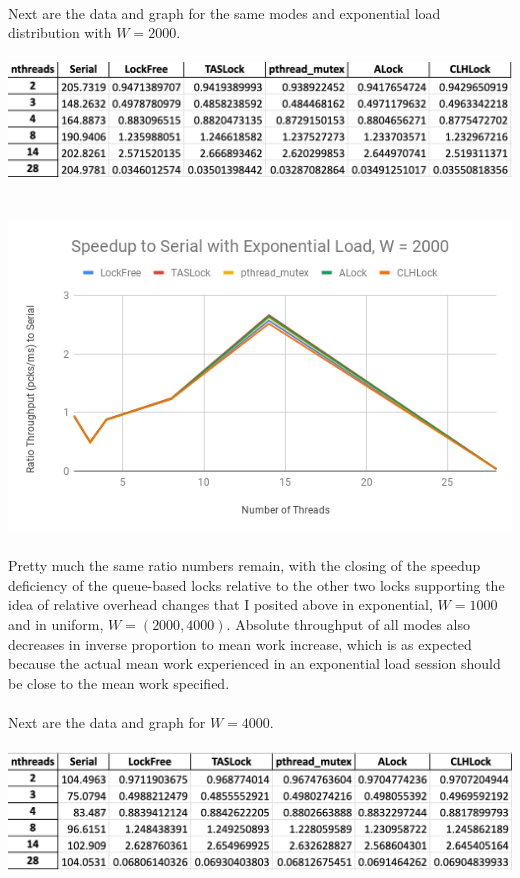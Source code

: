 \documentclass{article}
\begin{document}
\begin{adjustwidth}{-2cm}{-2cm}
\null\\Next are the data and graph for the same modes and exponential load distribution with $W=2000$.\\
\null\\
\includegraphics[width=\linewidth]{b_exp2000Data.png}\\ \null\\
\null\\
\includegraphics[width=\linewidth]{b_exp2000Graph.png}\\ \null\\
Pretty much the same ratio numbers remain, with the closing of the speedup deficiency of the queue-based locks relative to the other two locks supporting the idea of relative overhead changes that I posited above in exponential, $W=1000$ and in uniform, $W=(2000,4000)$. Absolute throughput of all modes also decreases in inverse proportion to mean work increase, which is as expected because the actual mean work experienced in an exponential load session should be close to the mean work specified.\\
\null\\Next are the data and graph for $W=4000$.\\
\null\\
\includegraphics[width=\linewidth]{b_exp4000Data.png}\\ \null\\

\end{adjustwidth}
\end{document}

